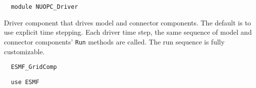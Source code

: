  
\setlength{\parskip}{0pt}
\setlength{\parindent}{0pt}
\setlength{\baselineskip}{11pt}
 
\def\bv{\begin{verbatim}}
\def\ev{\end{verbatim}}
\def\be{\begin{equation}}
\def\ee{\end{equation}}
\def\bea{\begin{eqnarray}}
\def\eea{\end{eqnarray}}
\def\bi{\begin{itemize}}
\def\ei{\end{itemize}}
\def\bn{\begin{enumerate}}
\def\en{\end{enumerate}}
\def\bd{\begin{description}}
\def\ed{\end{description}}
\def\({\left (}
\def\){\right )}
\def\[{\left [}
\def\]{\right ]}
\def\<{\left  \langle}
\def\>{\right \rangle}
\def\cI{{\cal I}}
\def\diag{\mathop{\rm diag}}
\def\tr{\mathop{\rm tr}}


\begin{verbatim}  module NUOPC_Driver
\end{verbatim}

Driver component that drives model and connector components. The default is to use explicit time stepping. Each driver time step, the same sequence of model and connector components' {\tt Run} methods are called. The run sequence is fully customizable.

\begin{verbatim}  ESMF_GridComp
\end{verbatim}

\begin{verbatim}  use ESMF
\end{verbatim}

